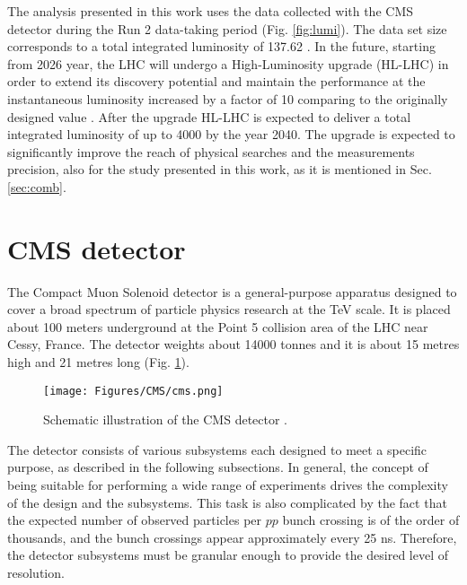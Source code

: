 The analysis presented in this work uses the data collected with the CMS detector during the Run 2 data-taking period (Fig. \ref{fig:lumi}). The data set size corresponds to a total integrated luminosity of 137.62 \ifb. In the future, starting from 2026 year, the LHC will undergo a High-Luminosity upgrade (HL-LHC) in order to extend its discovery potential and maintain the performance at the instantaneous luminosity increased by a factor of 10 comparing to the originally designed value \cite{ZurbanoFernandez:2020cco}. After the upgrade HL-LHC is expected to deliver a total integrated luminosity of up to 4000 \ifb by the year 2040. The upgrade is expected to significantly improve the reach of physical searches and the measurements precision, also for the study presented in this work, as it is mentioned in Sec. \ref{sec:comb}.  


\section{CMS detector}\label{sec:cms}

The Compact Muon Solenoid detector \cite{CMS:2008xjf} is a general-purpose apparatus designed to cover a broad spectrum of particle physics research at the TeV scale. It is placed about 100 meters underground at the Point 5 collision area of the LHC near Cessy, France. The detector weights about 14000 tonnes and it is about 15 metres high and 21 metres long (Fig. \ref{fig:cms}). 

\begin{figure}[h!]
    \centering
    \texttt{[image: Figures/CMS/cms.png]}
    \caption{Schematic illustration of the CMS detector \cite{CMS:web-detector}.}
    \label{fig:cms}
\end{figure}

The detector consists of various subsystems each designed to meet a specific purpose, as described in the following subsections. In general, the concept of being suitable for performing a wide range of experiments drives the complexity of the design and the subsystems. This task is also complicated by the fact that the expected number of observed particles per $pp$ bunch crossing is of the order of thousands, and the bunch crossings appear approximately every 25 ns. Therefore, the detector subsystems must be granular enough to provide the desired level of resolution.

